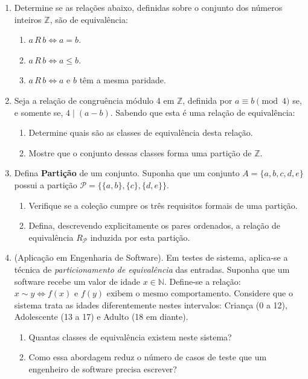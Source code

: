 \documentclass[12pt]{article}
\begin{document}
\begin{enumerate}
\item Determine se as relações abaixo, definidas sobre o conjunto dos números inteiros \(\mathbb{Z}\), são de equivalência:
\begin{enumerate}[label=\alph*)]
    \item \(a\,R\,b \Leftrightarrow a = b\).
    \item \(a\,R\,b \Leftrightarrow a \le b\).
    \item \(a\,R\,b \Leftrightarrow a\) e \(b\) têm a mesma paridade.
\end{enumerate}

\item Seja a relação de congruência módulo 4 em \(\mathbb{Z}\), definida por \(a \equiv b \pmod{4}\) se, e somente se, \(4 \mid (a - b)\). Sabendo que esta é uma relação de equivalência:
\begin{enumerate}[label=\alph*)]
    \item Determine quais são as classes de equivalência desta relação.
    \item Mostre que o conjunto dessas classes forma uma partição de \(\mathbb{Z}\).
\end{enumerate}

\item Defina \textbf{Partição} de um conjunto. Suponha que um conjunto \(A = \{a, b, c, d, e\}\) possui a partição \(\mathcal{P} = \{\{a, b\}, \{c\}, \{d, e\}\}\).
\begin{enumerate}[label=\alph*)]
    \item Verifique se a coleção cumpre os três requisitos formais de uma partição.
    \item Defina, descrevendo explicitamente os pares ordenados, a relação de equivalência \(R_\mathcal{P}\) induzida por esta partição.
\end{enumerate}

\item (Aplicação em Engenharia de Software). Em testes de sistema, aplica-se a técnica de \textit{particionamento de equivalência} das entradas. Suponha que um software recebe um valor de idade \(x \in \mathbb{N}\). Define-se a relação:
\(x \sim y \Leftrightarrow f(x) \text{ e } f(y) \text{ exibem o mesmo comportamento}\).
Considere que o sistema trata as idades diferentemente nestes intervalos: Criança (0 a 12), Adolescente (13 a 17) e Adulto (18 em diante).
\begin{enumerate}[label=\alph*)]
    \item Quantas classes de equivalência existem neste sistema?
    \item Como essa abordagem reduz o número de casos de teste que um engenheiro de software precisa escrever?
\end{enumerate}

\end{enumerate}
\end{document}
